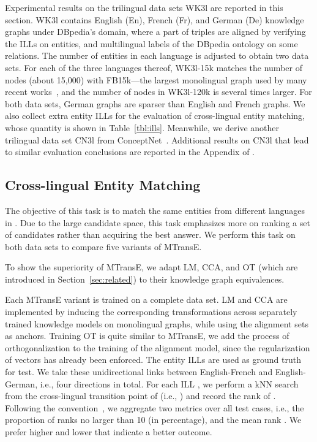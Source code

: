 \documentclass{article}
\def\inv{\vspace{-0.1cm}}
\begin{document}
 Experimental results on the trilingual data sets WK3l are reported in this section. WK3l contains English (En), French (Fr), and German (De) knowledge graphs under DBpedia's  domain, where a part of triples are aligned by verifying the ILLs on entities, and multilingual labels of the DBpedia ontology on some relations. The number of entities in each language is adjusted to obtain two data sets.
For each of the three languages thereof, WK3l-15k matches the number of nodes (about 15,000)
with FB15k---the largest monolingual graph used by many recent works~\cite{zhong2015aligning,lin2015learning,ji2015knowledge,jia2016locally}, and the number of nodes in WK3l-120k is several times larger.
For both data sets, German graphs are sparser than English and French graphs.
We also collect extra entity ILLs for the evaluation of cross-lingual entity matching, whose quantity is shown in Table~\ref{tbl:ills}.
Meanwhile, we derive another trilingual data set CN3l from ConceptNet~\cite{speer2013conceptnet}. Additional results on CN3l that lead to similar evaluation conclusions are reported in the Appendix of \cite{chen2016arxiv}.


\inv
\subsection{Cross-lingual Entity Matching} \label{sec:entity_matching}
The objective of this task is to match the same entities from different languages in . Due to the large candidate \mbox{space}, this task emphasizes more on ranking a set of candidates rather than acquiring the best answer. We perform this task on both data sets to compare five variants of MTransE.\par

To show the superiority of MTransE, we adapt LM, CCA, and OT (which are introduced in Section~\ref{sec:related}) to their knowledge graph equivalences.

 Each MTransE variant is trained on a complete data set. LM and CCA are implemented by inducing the corresponding transformations across separately trained knowledge models on monolingual graphs, while using the alignment sets as anchors.
Training OT is quite similar to MTransE, we add the process of orthogonalization to the training of the alignment model, since the regularization of vectors has already been enforced.
The entity ILLs are used as ground truth for test. We take these unidirectional links between English-French and English-German, i.e., four directions in total. For each ILL , we perform a kNN search from the cross-lingual transition point of  (i.e., )
and record the rank of . Following the convention~\cite{xing2015normalized,jia2016locally},
we aggregate two metrics over all test cases, i.e., the proportion of ranks no larger than 10  (in percentage), and the mean rank . We prefer higher  and lower  that indicate a better outcome. \par
\end{document}
